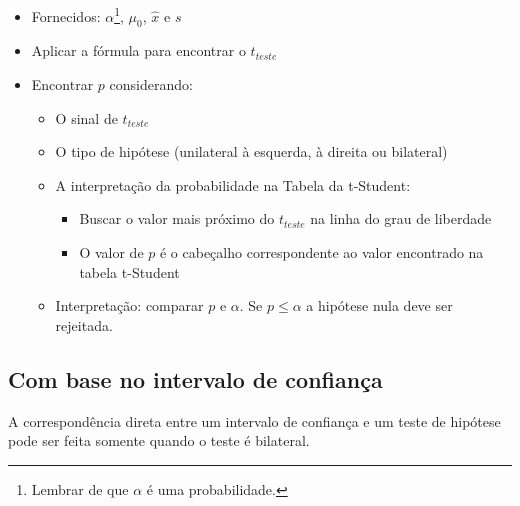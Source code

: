 \begin{itemize}
	\item Fornecidos: \(\alpha\)\footnote{Lembrar de que \(\alpha\) é uma probabilidade.}, \(\mu_0\), \(\hat{x}\) e \(s\)
	\item Aplicar a fórmula para encontrar o \(t_{teste}\)
	\item Encontrar \(p\) considerando:
	\begin{itemize}
		\item O sinal de \(t_{teste}\)
		\item O tipo de hipótese (unilateral à esquerda, à direita ou bilateral)
		\item A interpretação da probabilidade na Tabela da t-Student:
			\begin{itemize}
				\item Buscar o valor mais próximo do \(t_{teste}\) na linha do grau de liberdade
				\item O valor de \(p\) é o cabeçalho correspondente ao valor encontrado na tabela t-Student
			\end{itemize}
		\item Interpretação: comparar \(p\) e \(\alpha\). Se \(p \leq \alpha\) a hipótese nula deve ser rejeitada.
	\end{itemize}
\end{itemize}

\subsection{Com base no intervalo de confiança}

A correspondência direta entre um intervalo de confiança e um teste de hipótese pode ser feita somente quando o teste é bilateral.